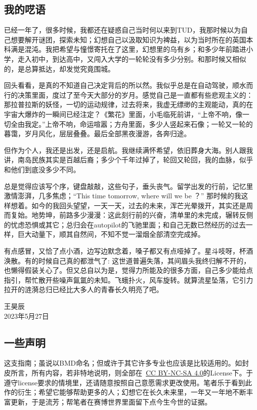 \subsection{我的呓语}
已经一年了，很多时候，我都还在疑惑自己当时何以来到TUD，我那时候以为自己想要解开谜团，探索未知；幻想自己以汲取知识为裨益，以为当时所在的英国本科满是混沌。我把希望与憧憬寄托在了这里，幻想里的乌有乡；和多少年前踏进小学，走入初中，到达高中，又闯入大学的一轮轮没有多少分别。和那时候又相似的，是总算抵达，却发觉究竟围城。

回头看看，是真的不知道自己决定背后的所以然。我似乎总是在自动驾驶，顺水而行的决策里面，度过了至今天大部分的岁月。感觉自己是一直都有些悲观主义的：那拉普拉斯的妖怪，一切的运动规律，过去将来，我虚无缥缈的主观能动，真的在宇宙大爆炸的一瞬间已经注定？《繁花》里面，小毛临死前讲，“上帝不响，像一切全由我定。”上帝不响，命运喧嚣；方舟里面，多少人竖起来石像；一轮又一轮的暮霭，岁月风化，层层叠叠。最后全部黑夜漫游，各奔归途。

但作为个人，我还是出发，还是启航。我继续满怀希望，依旧葬身大海。别人跟我讲，南岛民族其实是百越后裔；多少个千年过掉了，轮回又轮回，我的血脉，似乎和他们到底没多少不同。

总是觉得应该写个序，键盘敲敲，这些句子，垂头丧气。留学出发的行前，记忆里激情澎湃，几多焦虑；“This time tomorrow, where will we be ？” 那时候的我这样想着。如今的我回头望望，一天一天，过去的未来，浑芒光晕拨开，其实还是周而复始。地势坤，前路多少漫漫：这此刻行前的兴奋，清单里的未完成，辗转反侧的忧虑恐惧或其它；总归会在autopilot的飞驰里面；和自己无数已然经历的过去一样，巨大动量下，顺其自然间，不知不觉一溜烟全部清空完成掉。

有点感冒，又恰了点小酒，边写边默念着，嗓子都又有点哑掉了。星斗吱呀，杯酒涣散。有的时候自己真的都泄气了: 这世道普遍失落，其间眉头我终归解不开的，也懒得假装关心了。但又总自以为是，觉得力所能及的很多方面，自己多少能给点指引，帮忙散开些噪声氤氲的未知。飞蛾扑火，风车旋转。就算流星坠落，它引力拉开的涟漪总归已经比大多人的青春长久明亮了吧。

\vspace*{\fill}
\begin{flushright}
王昊辰\\
2023年5月27日
\end{flushright}

\newpage\subsection{一些声明}
这支指南；虽说以BMD命名；但或许于其它许多专业也应该是比较适用的。如封皮所言，所有内容，若非特地说明，则全部在\ccbyncsa\ \href{http://creativecommons.org/licenses/by-nc-sa/4.0/}{\uline{CC BY-NC-SA 4.0}}的License下。于遵守license要求的情境里，还请随意按照自己意愿需求更改使用。笔者乐于看到此作的衍生；希望它能够帮助更多的人；幻想它在长久未来里，一年又一年地不断丰富更新，于是流芳；帮笔者在赛博世界里面留下点今生今世的证据。

